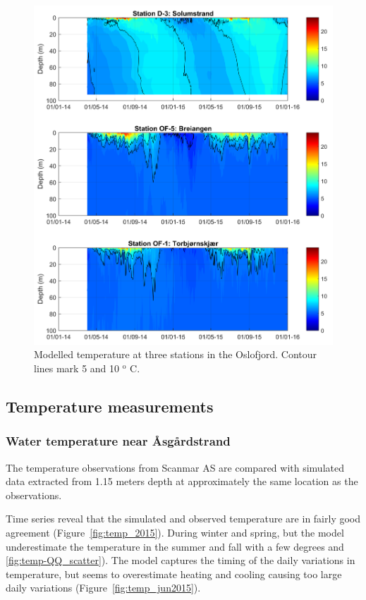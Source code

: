 \begin{figure}[tbh]
	\centerline{
		\includegraphics*[trim=0cm 0cm 0cm 0cm,clip=true,width=\textwidth]{Figurer/Temp_Mod_2014_2015}}
	\caption{\small Modelled temperature at three stations in the Oslofjord. Contour lines mark 5 and 10 $^{\textrm{o}}$ C.}
	\label{fig:Temp_Mod_2014_2015}
\end{figure}

\clearpage
\subsection{Temperature measurements}
\label{subsec:tempee}
\subsubsection{Water temperature near \AA sg\aa rdstrand}

The temperature observations from Scanmar AS are compared with simulated data extracted from 1.15 meters depth at approximately the same location as the observations.

Time series reveal that the simulated and observed temperature are in fairly good agreement (Figure~\ref{fig:temp_2015}). During winter and spring, but the model underestimate the temperature in the summer and fall with a few degrees  and \ref{fig:temp-QQ_scatter}). The model captures the timing of the daily variations in temperature, but seems to overestimate heating and cooling causing too large daily variations (Figure~\ref{fig:temp_jun2015}). 

